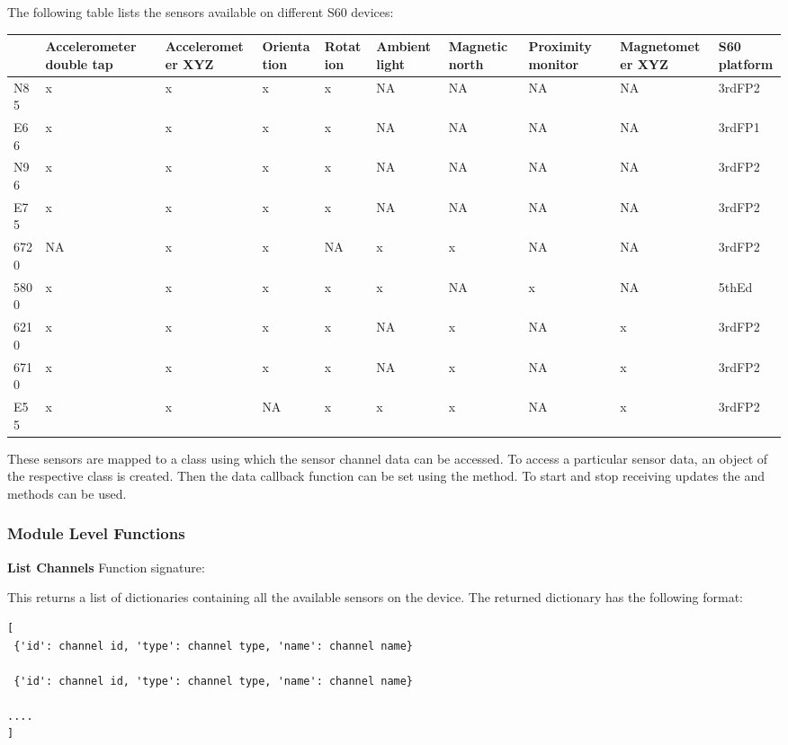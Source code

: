The following table lists the sensors available on different S60 devices:
\begin{table}[htbp]
\begin{center}
\begin{tabular}{l|l|l|l|l|l|l|l|l|l}
\hline
& {\bf Accelerometer double tap} & {\bf Accelerometer XYZ} & {\bf Orientation} & {\bf Rotation} & {\bf Ambient light} & {\bf Magnetic north} & {\bf Proximity monitor} & {\bf Magnetometer XYZ} & {\bf S60 platform}  \\
\hline
N85 & x & x & x & x & NA & NA & NA & NA & 3rdFP2  \\
\hline
E66 & x & x & x & x & NA & NA & NA & NA & 3rdFP1  \\
\hline
N96 & x & x & x & x & NA & NA & NA & NA & 3rdFP2  \\
\hline
E75 & x & x & x & x & NA & NA & NA & NA & 3rdFP2  \\
\hline
6720 & NA & x & x & NA & x & x & NA & NA & 3rdFP2  \\
\hline
5800 & x & x & x & x & x & NA & x & NA & 5thEd  \\
\hline
6210 & x & x & x & x & NA & x & NA & x & 3rdFP2  \\
\hline
6710 & x & x & x & x & NA & x & NA & x & 3rdFP2  \\
\hline
E55 & x & x & NA & x & x & x & NA & x & 3rdFP2  \\
\end{tabular}
\end{center}
\end{table}

These sensors are mapped to a class using which the sensor channel data can be accessed. To access a particular sensor data, an object of the respective class is created. Then the data callback function can be set using the  method. To start and stop receiving updates the  and  methods can be used.

\subsubsection{Module Level Functions}

{\bf List Channels} \break
Function signature: 

This returns a list of dictionaries containing all the available sensors on the device. The returned dictionary has the following format:

\begin{verbatim}
[
 {'id': channel id, 'type': channel type, 'name': channel name}

 {'id': channel id, 'type': channel type, 'name': channel name}

....
]
\end{verbatim}

